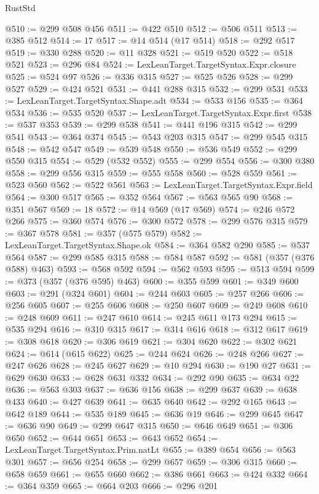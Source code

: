 \begin{lexlean}{RustStd}
\begin{coremodule}
@510 := @299 @508 @456
@511 := @422 @510
@512 := @506 @511
@513 := @385 @512
@514 := 17
@517 := @14 @514 (@17 @514)
@518 := @292 @517
@519 := @330 @288
@520 := @11 @328
@521 := @519 @520
@522 := @518 @521
@523 := @296 @84
@524 := LexLeanTarget.TargetSyntax.Expr.closure
@525 := @524 @97
@526 := @336 @315
@527 := @525 @526
@528 := @299 @527
@529 := @424 @521
@531 := @441 @288 @315
@532 := @299 @531
@533 := LexLeanTarget.TargetSyntax.Shape.adt
@534 := @533 @156
@535 := @364 @534
@536 := @535 @520
@537 := LexLeanTarget.TargetSyntax.Expr.first
@538 := @537 @353
@539 := @299 @538
@541 := @441 @196 @315
@542 := @299 @541
@543 := @364 @374
@545 := @543 @203 @315
@547 := @299 @545 @315
@548 := @542 @547
@549 := @539 @548
@550 := @536 @549
@552 := @299 @550 @315
@554 := @529 (@532 @552)
@555 := @299 @554
@556 := @300 @380
@558 := @299 @556 @315
@559 := @555 @558
@560 := @528 @559
@561 := @523 @560
@562 := @522 @561
@563 := LexLeanTarget.TargetSyntax.Expr.field
@564 := @300 @517
@565 := @352 @564
@567 := @563 @565 @90
@568 := @351 @567
@569 := 18
@572 := @14 @569 (@17 @569)
@574 := @246 @572 @266
@575 := @360 @574
@576 := @300 @572
@578 := @299 @576 @315
@579 := @367 @578
@581 := @357 (@575 @579)
@582 := LexLeanTarget.TargetSyntax.Shape.ok
@584 := @364 @582 @290
@585 := @537 @564
@587 := @299 @585 @315
@588 := @584 @587
@592 := @581 (@357 (@376 @588) @463)
@593 := @568 @592
@594 := @562 @593
@595 := @513 @594
@599 := @373 (@357 (@376 @595) @463)
@600 := @355 @599
@601 := @349 @600
@603 := @291 (@324 @601)
@604 := @244 @603
@605 := @257 @266
@606 := @256 @605
@607 := @255 @606
@608 := @250 @607
@609 := @249 @608
@610 := @248 @609
@611 := @247 @610
@614 := @245 @611 @173 @294
@615 := @535 @294
@616 := @310 @315
@617 := @314 @616
@618 := @312 @617
@619 := @308 @618
@620 := @306 @619
@621 := @304 @620
@622 := @302 @621
@624 := @614 (@615 @622)
@625 := @244 @624
@626 := @248 @266
@627 := @247 @626
@628 := @245 @627
@629 := @10 @294
@630 := @190 @27
@631 := @629 @630
@633 := @628 @631 @332
@634 := @292 @90
@635 := @634 @22
@636 := @563 @303
@637 := @636 @156
@638 := @299 @637
@639 := @638 @433
@640 := @427 @639
@641 := @635 @640
@642 := @292 @165
@643 := @642 @189
@644 := @535 @189
@645 := @636 @19
@646 := @299 @645
@647 := @636 @90
@649 := @299 @647 @315
@650 := @646 @649
@651 := @306 @650
@652 := @644 @651
@653 := @643 @652
@654 := LexLeanTarget.TargetSyntax.Prim.natLt
@655 := @389 @654
@656 := @563 @301
@657 := @656 @254
@658 := @299 @657
@659 := @306 @315
@660 := @658 @659
@661 := @655 @660
@662 := @386 @661
@663 := @424 @332
@664 := @364 @359
@665 := @664 @203
@666 := @296 @201

\end{coremodule}
\end{lexlean}
